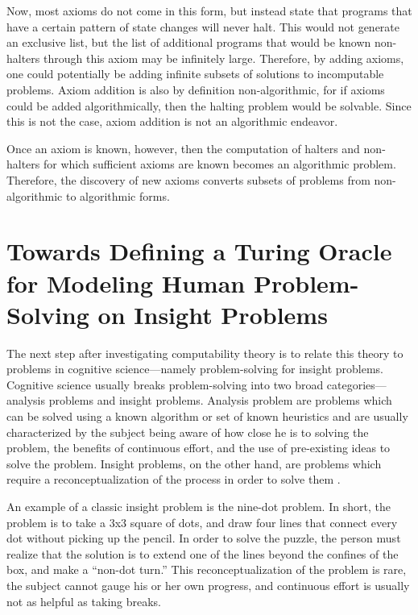 Now, most axioms do not come in this form, but instead state that programs that have a certain pattern of state changes will never halt.  This would not generate an exclusive list, but the list of additional programs that would be known non-halters through this axiom may be infinitely large.  Therefore, by adding axioms, one could potentially be adding infinite subsets of solutions to incomputable problems.  Axiom addition is also by definition non-algorithmic, for if axioms could be added algorithmically, then the halting problem would be solvable.  Since this is not the case, axiom addition is not an algorithmic endeavor.

Once an axiom is known, however, then the computation of halters and non-halters for which sufficient axioms are known becomes an algorithmic problem.  Therefore, the discovery of new axioms converts subsets of problems from non-algorithmic to algorithmic forms.

\section{Towards Defining a Turing Oracle for Modeling Human Problem-Solving on Insight Problems}

The next step after investigating computability theory is to relate this theory to problems in cognitive science---namely problem-solving for insight problems.  
Cognitive science usually breaks problem-solving into two broad categories---analysis problems and insight problems.  Analysis problem are problems which can be solved using a known algorithm or set of known heuristics and are usually characterized by the subject being aware of how close he is to solving the problem, the benefits of continuous effort, and the use of pre-existing ideas to solve the problem.  Insight problems, on the other hand, are problems which require a reconceptualization of the process in order to solve them \citep{chronicleetal2004}. 

An example of a classic insight problem is the nine-dot problem.  In short, the problem is to take a 3x3 square of dots, and draw four lines that connect every dot without picking up the pencil.  In order to solve the puzzle, the person must realize that the solution is to extend one of the lines beyond the confines of the box, and make a ``non-dot turn.''  This reconceptualization of the problem is rare, the subject cannot gauge his or her own progress, and continuous effort is usually not as helpful as taking breaks.

